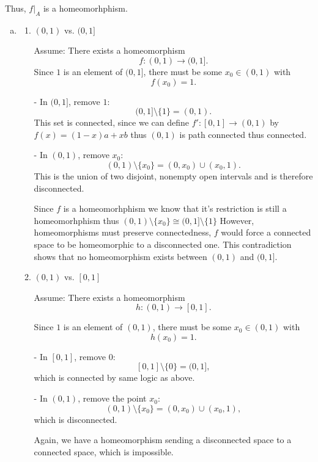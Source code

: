 \documentclass[12pt, letterpaper]{article}
\begin{document}
Thus, $f\vert_{A}$ is a homeomorhphism.

\begin{enumerate}[(a)]
    \item \begin{enumerate}[1.]
        \item \((0,1)\) vs. \((0,1]\)
        
        Assume: There exists a homeomorphism
        \[
        f:(0,1)\to (0,1].
        \]
        Since \(1\) is an element of \((0,1]\), there must be some \(x_0\in (0,1)\) with
        \[
        f(x_0)=1.
        \]
        
        - In \((0,1]\), remove \(1\):
          \[
          (0,1]\setminus\{1\}=(0,1).
          \]
          This set is connected, since we can define $f':[0,1] \to (0,1)$ by $f(x)=(1-x)a+xb$ thus $(0,1)$ is path connected thus connected.
        
        - In \((0,1)\), remove \(x_0\):
          \[
          (0,1)\setminus\{x_0\}=(0,x_0)\cup (x_0,1).
          \]
          This is the union of two disjoint, nonempty open intervals and is therefore disconnected.
        
        Since $f$ is a homeomorhphism we know that it's restriction is still a homeomorhphism thus $(0,1) \setminus \{x_0\} \cong (0,1] \setminus \{1\}$ However, homeomorphisms must preserve connectedness, \(f\) would force a connected space to be homeomorphic to a disconnected one. This contradiction shows that no homeomorphism exists between \((0,1)\) and \((0,1]\).
        
        \item \((0,1)\) vs. \([0,1]\)
        
        Assume: There exists a homeomorphism
        \[
        h:(0,1)\to [0,1].
        \]
        
        Since \(1\) is an element of \((0,1)\), there must be some \(x_0\in (0,1)\) with
        \[
        h(x_0)=1.
        \]
        
        - In \([0,1]\), remove \(0\):
          \[
          [0,1]\setminus\{0\}=(0,1],
          \]
          which is connected by same logic as above.
        
        - In \((0,1)\), remove the point \(x_0\):
          \[
          (0,1)\setminus\{x_0\}=(0,x_0)\cup (x_0,1),
          \]
          which is disconnected.
        
        Again, we have a homeomorphism sending a disconnected space to a connected space, which is impossible.
        

\end{enumerate}
\end{enumerate}
\end{document}

